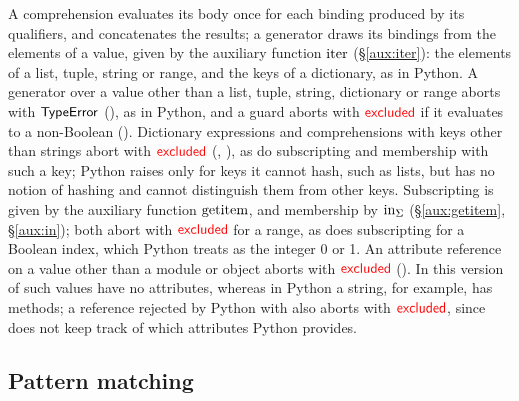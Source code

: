 A comprehension evaluates its body once for each binding produced by its qualifiers, and
concatenates the results; a generator draws its bindings from the elements of a value, given by the auxiliary
function $\mathrm{iter}$ (\S\ref{aux:iter}): the elements of a
list, tuple, string or range, and the keys of a dictionary, as in Python. A generator over a
value other than a list, tuple, string, dictionary or range aborts with $\mathsf{TypeError}$
(), as in Python, and a guard aborts with $\textcolor{red}{\mathsf{excluded}}$ if it
evaluates to a non-Boolean ().
Dictionary expressions and comprehensions with keys other than strings abort with
$\textcolor{red}{\mathsf{excluded}}$ (, ), as do subscripting and
membership with such a key; Python raises  only for keys it cannot hash, such as lists, but \PurePy
has no notion of hashing and cannot distinguish them from other keys.
Subscripting is given by the auxiliary function $\mathrm{getitem}$, and membership by
$\mathrm{in}_{\Sigma}$ (\S\ref{aux:getitem}, \S\ref{aux:in}); both abort with $\textcolor{red}{\mathsf{excluded}}$ for a range, as does
subscripting for a Boolean index, which Python treats as the integer 0 or 1. An attribute reference on a
value other than a module or object aborts with $\textcolor{red}{\mathsf{excluded}}$ (). In this version of \PurePy such values have no attributes, whereas in Python a string, for example, has methods; a reference rejected by Python with  also aborts with $\textcolor{red}{\mathsf{excluded}}$, since \PurePy does not keep track of which attributes Python provides.





\subsection{Pattern matching}
\label{sec:eval-patterns}

